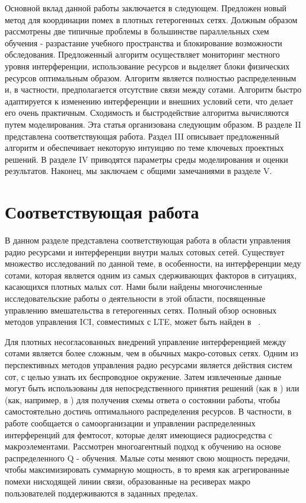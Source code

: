 Основной вклад данной работы заключается в следующем. Предложен новый метод для координации помех в плотных гетерогенных сетях. Должным образом рассмотрены две типичные проблемы в большинстве параллельных схем обучения - разрастание учебного пространства и блокирование возможности обследования. Предложенный алгоритм осуществляет мониторинг местного уровня интерференции, использование ресурсов и выделяет блоки физических ресурсов оптимальным образом. Алгоритм является полностью распределенным и, в частности, предполагается отсутствие связи между сотами. Алгоритм быстро адаптируется к изменению интерференции и внешних условий сети, что делает его очень практичным. Сходимость и быстродействие алгоритма вычисляются путем моделирования.
Эта статья организована следующим образом. В разделе II представлена соответствующая работа. Раздел III описывает предложенный алгоритм и обеспечивает некоторую интуицию по теме ключевых проектных решений. В разделе IV приводятся параметры среды моделирования и оценки результатов. Наконец, мы заключаем с общими замечаниями в разделе V.

\section{Соответствующая работа}
В данном разделе представлена соответствующая работа в области управления радио ресурсами и интерференции внутри малых сотовых сетей. Существует множество исследований по данной теме, в особенности, на интерференции меду сотами, которая является одним из самых сдерживающих факторов в ситуациях, касающихся плотных малых сот. Нами были найдены многочисленные исследовательские работы о деятельности в этой области, посвященные управлению вмешательства в гетерогенных сетях. Полный обзор основных методов управления ICI, совместимых с LTE, может быть найден в ~\cite{cite_overview}.

Для плотных несогласованных внедрений управление интерференцией между сотами является более сложным, чем в обычных макро-сотовых сетях. Одним из перспективных методов управления радио ресурсами является действия систем сот, с целью узнать их беспроводное окружение. Затем извлеченные данные могут быть использованы для непосредственного принятия решений (как в \cite{mab}) или (как, например, в \cite{q-learning}) для получения схемы ответа о состоянии работы, чтобы самостоятельно достичь оптимального распределения ресурсов. В частности, в работе \cite{q-learning} сообщается о самоорганизации и управлении распределенных интерференций для фемтосот, которые делят имеющиеся радиосредства с макроэлементами. Рассмотрен многоагентный подход к обучению на основе распределенного Q - обучения. Малые соты меняют свою мощность передачи, чтобы максимизировать суммарную мощность, в то время как агрегированные помехи нисходящей линии связи, образованные на ресиверах макро пользователей поддерживаются в заданных пределах.

